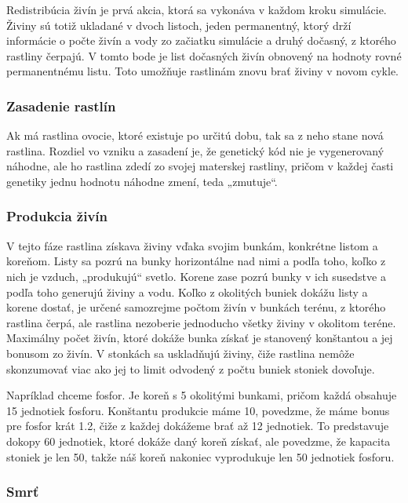 \documentclass[12pt]{article}
\begin{document}
Redistribúcia živín je prvá akcia, ktorá sa vykonáva v každom kroku simulácie. Živiny sú totiž
ukladané v dvoch listoch, jeden permanentný, ktorý drží informácie o počte
živín a vody zo začiatku simulácie a druhý dočasný, z ktorého rastliny čerpajú.
V tomto bode je list dočasných živín obnovený na hodnoty rovné permanentnému listu.
Toto umožňuje rastlinám znovu brať živiny v novom cykle.

\subsubsection{Zasadenie rastlín}

Ak má rastlina ovocie, ktoré existuje po určitú dobu, tak sa z neho stane nová
rastlina. Rozdiel vo vzniku a zasadení je, že genetický kód nie je
vygenerovaný náhodne, ale ho rastlina zdedí zo svojej materskej rastliny,
pričom v každej časti genetiky jednu hodnotu náhodne zmení, teda „zmutuje“.

\subsubsection{Produkcia živín}

V tejto fáze rastlina získava živiny vďaka svojim bunkám, konkrétne listom
a koreňom. Listy sa pozrú na bunky horizontálne nad nimi a podľa toho, koľko
z nich je vzduch, „produkujú“ svetlo. Korene zase pozrú bunky v ich susedstve
a podľa toho generujú živiny a vodu. Koľko z okolitých buniek dokážu listy
a korene dostať, je určené samozrejme počtom živín v bunkách terénu, z ktorého
rastlina čerpá, ale rastlina nezoberie jednoducho všetky živiny v okolitom
teréne. Maximálny počet živín, ktoré dokáže bunka získať je stanovený
konštantou a jej bonusom zo živín. V stonkách sa uskladňujú živiny, čiže
rastlina nemôže skonzumovať viac ako jej to limit odvodený z počtu buniek
stoniek dovoľuje. 

Napríklad chceme fosfor. Je koreň s 5 okolitými bunkami,
pričom každá obsahuje 15 jednotiek fosforu. Konštantu produkcie máme 10,
povedzme, že máme bonus pre fosfor krát 1.2, čiže z každej dokážeme brať až 12
jednotiek. To predstavuje dokopy 60 jednotiek, ktoré dokáže daný koreň získať,
ale povedzme, že kapacita stoniek je len 50, takže náš koreň nakoniec
vyprodukuje len 50 jednotiek fosforu.

\subsubsection{Smrť}
\end{document}
